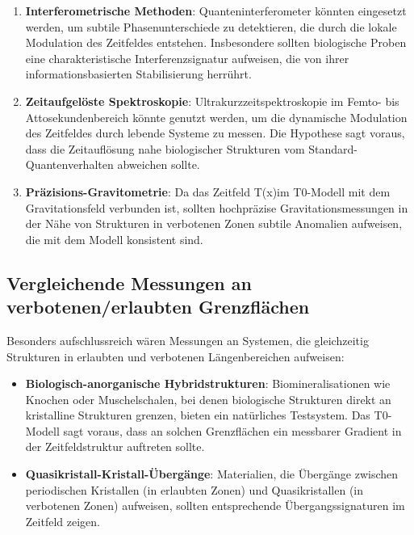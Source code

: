 \documentclass[12pt,a4paper]{article}
\newcommand{\Tfield}{T(x)}
\begin{document}
	\begin{enumerate}
		\item \textbf{Interferometrische Methoden}: Quanteninterferometer könnten eingesetzt werden, um subtile Phasenunterschiede zu detektieren, die durch die lokale Modulation des Zeitfeldes entstehen. Insbesondere sollten biologische Proben eine charakteristische Interferenzsignatur aufweisen, die von ihrer informationsbasierten Stabilisierung herrührt.
		
		\item \textbf{Zeitaufgelöste Spektroskopie}: Ultrakurzzeitspektroskopie im Femto- bis Attosekundenbereich könnte genutzt werden, um die dynamische Modulation des Zeitfeldes durch lebende Systeme zu messen. Die Hypothese sagt voraus, dass die Zeitauflösung nahe biologischer Strukturen vom Standard-Quantenverhalten abweichen sollte.
		
		\item \textbf{Präzisions-Gravitometrie}: Da das Zeitfeld \Tfield im T0-Modell mit dem Gravitationsfeld verbunden ist, sollten hochpräzise Gravitationsmessungen in der Nähe von Strukturen in verbotenen Zonen subtile Anomalien aufweisen, die mit dem Modell konsistent sind.
	\end{enumerate}
	
	\subsection{Vergleichende Messungen an verbotenen/erlaubten Grenzflächen}
	
	Besonders aufschlussreich wären Messungen an Systemen, die gleichzeitig Strukturen in erlaubten und verbotenen Längenbereichen aufweisen:
	
	\begin{itemize}
		\item \textbf{Biologisch-anorganische Hybridstrukturen}: Biomineralisationen wie Knochen oder Muschelschalen, bei denen biologische Strukturen direkt an kristalline Strukturen grenzen, bieten ein natürliches Testsystem. Das T0-Modell sagt voraus, dass an solchen Grenzflächen ein messbarer Gradient in der Zeitfeldstruktur auftreten sollte.
		
		\item \textbf{Quasikristall-Kristall-Übergänge}: Materialien, die Übergänge zwischen periodischen Kristallen (in erlaubten Zonen) und Quasikristallen (in verbotenen Zonen) aufweisen, sollten entsprechende Übergangssignaturen im Zeitfeld zeigen.
	\end{itemize}
	
\end{document}
